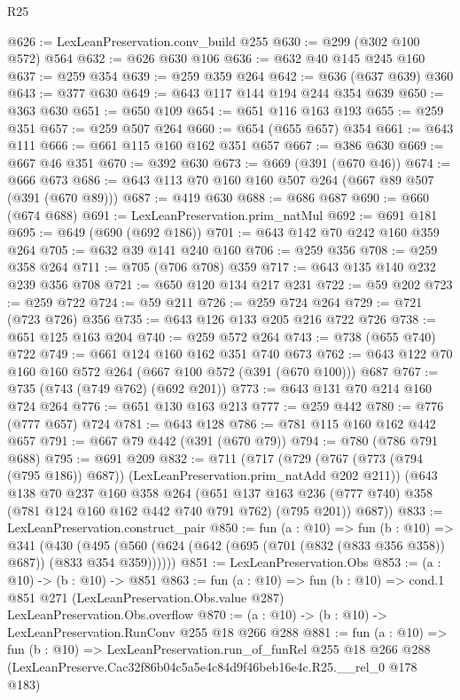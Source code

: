 \begin{lexlean}{R25}
\begin{coremodule}
@626 := LexLeanPreservation.conv_build @255
@630 := @299 (@302 @100 @572) @564
@632 := @626 @630 @106
@636 := @632 @40 @145 @245 @160
@637 := @259 @354
@639 := @259 @359 @264
@642 := @636 (@637 @639) @360
@643 := @377 @630
@649 := @643 @117 @144 @194 @244 @354 @639
@650 := @363 @630
@651 := @650 @109
@654 := @651 @116 @163 @193
@655 := @259 @351
@657 := @259 @507 @264
@660 := @654 (@655 @657) @354
@661 := @643 @111
@666 := @661 @115 @160 @162 @351 @657
@667 := @386 @630
@669 := @667 @46 @351
@670 := @392 @630
@673 := @669 (@391 (@670 @46))
@674 := @666 @673
@686 := @643 @113 @70 @160 @160 @507 @264 (@667 @89 @507 (@391 (@670 @89)))
@687 := @419 @630
@688 := @686 @687
@690 := @660 (@674 @688)
@691 := LexLeanPreservation.prim_natMul
@692 := @691 @181
@695 := @649 (@690 (@692 @186))
@701 := @643 @142 @70 @242 @160 @359 @264
@705 := @632 @39 @141 @240 @160
@706 := @259 @356
@708 := @259 @358 @264
@711 := @705 (@706 @708) @359
@717 := @643 @135 @140 @232 @239 @356 @708
@721 := @650 @120 @134 @217 @231
@722 := @59 @202
@723 := @259 @722
@724 := @59 @211
@726 := @259 @724 @264
@729 := @721 (@723 @726) @356
@735 := @643 @126 @133 @205 @216 @722 @726
@738 := @651 @125 @163 @204
@740 := @259 @572 @264
@743 := @738 (@655 @740) @722
@749 := @661 @124 @160 @162 @351 @740 @673
@762 := @643 @122 @70 @160 @160 @572 @264 (@667 @100 @572 (@391 (@670 @100))) @687
@767 := @735 (@743 (@749 @762) (@692 @201))
@773 := @643 @131 @70 @214 @160 @724 @264
@776 := @651 @130 @163 @213
@777 := @259 @442
@780 := @776 (@777 @657) @724
@781 := @643 @128
@786 := @781 @115 @160 @162 @442 @657
@791 := @667 @79 @442 (@391 (@670 @79))
@794 := @780 (@786 @791 @688)
@795 := @691 @209
@832 := @711
    (@717
      (@729 (@767 (@773 (@794 (@795 @186)) @687)) (LexLeanPreservation.prim_natAdd @202 @211))
      (@643
        @138
        @70
        @237
        @160
        @358
        @264
        (@651 @137 @163 @236 (@777 @740) @358 (@781 @124 @160 @162 @442 @740 @791 @762) (@795 @201))
        @687))
@833 := LexLeanPreservation.construct_pair
@850 := fun (a : @10) =>
  fun (b : @10) =>
  @341
    (@430 (@495 (@560 (@624 (@642 (@695 (@701 (@832 (@833 @356 @358)) @687)) (@833 @354 @359))))))
@851 := LexLeanPreservation.Obs
@853 := (a : @10) -> (b : @10) -> @851
@863 := fun (a : @10) =>
  fun (b : @10) =>
  cond.{1} @851 @271 (LexLeanPreservation.Obs.value @287) LexLeanPreservation.Obs.overflow
@870 := (a : @10) -> (b : @10) -> LexLeanPreservation.RunConv @255 @18 @266 @288
@881 := fun (a : @10) =>
  fun (b : @10) =>
  LexLeanPreservation.run_of_funRel
    @255
    @18
    @266
    @288
    (LexLeanPreserve.Cac32f86b04c5a5e4c84d9f46beb16e4c.R25.__rel_0 @178 @183)
\end{coremodule}
\end{lexlean}
